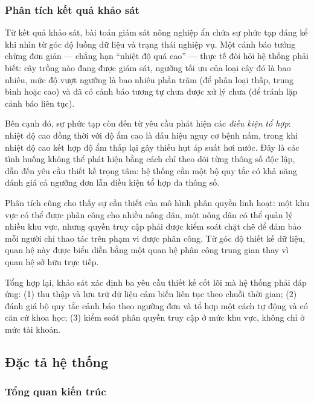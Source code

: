\documentclass[13pt,a4paper]{extarticle}
\numberwithin{figure}{section}
\numberwithin{table}{section}
\begin{document}
	\subsubsection{Phân tích kết quả khảo sát}
	
	Từ kết quả khảo sát, bài toán giám sát nông nghiệp ẩn chứa sự phức tạp đáng kể khi nhìn từ góc độ luồng dữ liệu và trạng thái nghiệp vụ. Một cảnh báo tưởng chừng đơn giản --- chẳng hạn ``nhiệt độ quá cao'' --- thực tế đòi hỏi hệ thống phải biết: cây trồng nào đang được giám sát, ngưỡng tối ưu của loại cây đó là bao nhiêu, mức độ vượt ngưỡng là bao nhiêu phần trăm (để phân loại thấp, trung bình hoặc cao) và đã có cảnh báo tương tự chưa được xử lý chưa (để tránh lặp cảnh báo liên tục).
	
	Bên cạnh đó, sự phức tạp còn đến từ yêu cầu phát hiện các \textit{điều kiện tổ hợp}: nhiệt độ cao đồng thời với độ ẩm cao là dấu hiệu nguy cơ bệnh nấm, trong khi nhiệt độ cao kết hợp độ ẩm thấp lại gây thiếu hụt áp suất hơi nước. Đây là các tình huống không thể phát hiện bằng cách chỉ theo dõi từng thông số độc lập, dẫn đến yêu cầu thiết kế trọng tâm: hệ thống cần một bộ quy tắc có khả năng đánh giá cả ngưỡng đơn lẫn điều kiện tổ hợp đa thông số.
	
	Phân tích cũng cho thấy sự cần thiết của mô hình phân quyền linh hoạt: một khu vực có thể được phân công cho nhiều nông dân, một nông dân có thể quản lý nhiều khu vực, nhưng quyền truy cập phải được kiểm soát chặt chẽ để đảm bảo mỗi người chỉ thao tác trên phạm vi được phân công. Từ góc độ thiết kế dữ liệu, quan hệ này được biểu diễn bằng một quan hệ phân công trung gian thay vì quan hệ sở hữu trực tiếp.
	
	Tổng hợp lại, khảo sát xác định ba yêu cầu thiết kế cốt lõi mà hệ thống phải đáp ứng: (1) thu thập và lưu trữ dữ liệu cảm biến liên tục theo chuỗi thời gian; (2) đánh giá bộ quy tắc cảnh báo theo ngưỡng đơn và tổ hợp một cách tự động và có căn cứ khoa học; (3) kiểm soát phân quyền truy cập ở mức khu vực, không chỉ ở mức tài khoản.
	
	\subsection{Đặc tả hệ thống}
	
	\subsubsection{Tổng quan kiến trúc}
	
\end{document}
